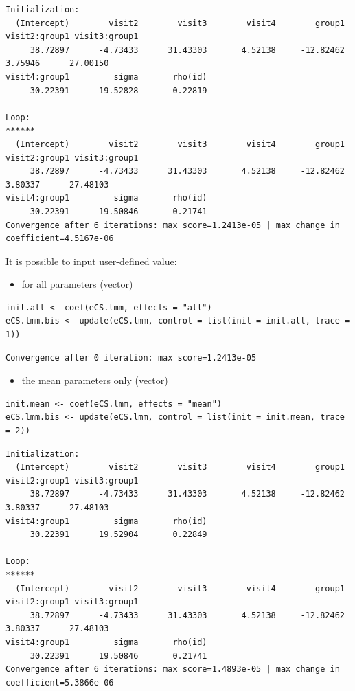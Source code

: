 \documentclass[12pt]{article}
\begin{document}
\begin{verbatim}
Initialization:
  (Intercept)        visit2        visit3        visit4        group1 visit2:group1 visit3:group1 
     38.72897      -4.73433      31.43303       4.52138     -12.82462       3.75946      27.00150 
visit4:group1         sigma       rho(id) 
     30.22391      19.52828       0.22819 

Loop:
******
  (Intercept)        visit2        visit3        visit4        group1 visit2:group1 visit3:group1 
     38.72897      -4.73433      31.43303       4.52138     -12.82462       3.80337      27.48103 
visit4:group1         sigma       rho(id) 
     30.22391      19.50846       0.21741 
Convergence after 6 iterations: max score=1.2413e-05 | max change in coefficient=4.5167e-06
\end{verbatim}

It is possible to input user-defined value:
\begin{itemize}
\item for all parameters (vector)
\end{itemize}
\lstset{language=r,label= ,caption= ,captionpos=b,numbers=none}
\begin{lstlisting}
init.all <- coef(eCS.lmm, effects = "all")
eCS.lmm.bis <- update(eCS.lmm, control = list(init = init.all, trace = 1))
\end{lstlisting}

\begin{verbatim}
Convergence after 0 iteration: max score=1.2413e-05
\end{verbatim}


\begin{itemize}
\item the mean parameters only (vector)
\end{itemize}
\lstset{language=r,label= ,caption= ,captionpos=b,numbers=none}
\begin{lstlisting}
init.mean <- coef(eCS.lmm, effects = "mean")
eCS.lmm.bis <- update(eCS.lmm, control = list(init = init.mean, trace = 2))
\end{lstlisting}

\begin{verbatim}
Initialization:
  (Intercept)        visit2        visit3        visit4        group1 visit2:group1 visit3:group1 
     38.72897      -4.73433      31.43303       4.52138     -12.82462       3.80337      27.48103 
visit4:group1         sigma       rho(id) 
     30.22391      19.52904       0.22849 

Loop:
******
  (Intercept)        visit2        visit3        visit4        group1 visit2:group1 visit3:group1 
     38.72897      -4.73433      31.43303       4.52138     -12.82462       3.80337      27.48103 
visit4:group1         sigma       rho(id) 
     30.22391      19.50846       0.21741 
Convergence after 6 iterations: max score=1.4893e-05 | max change in coefficient=5.3866e-06
\end{verbatim}
\end{document}
